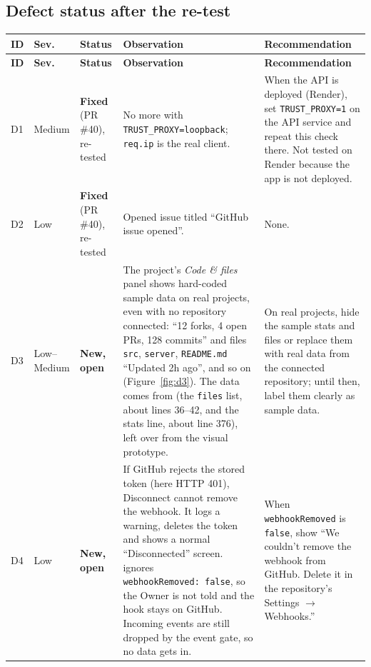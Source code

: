 \documentclass[11pt,a4paper]{article}
\begin{document}
\subsection{Defect status after the re-test}\label{sec:defect-status}
{\small
{}
\begin{xltabular}{\linewidth}{l l p{2.1cm} X X}
  \toprule
  \textbf{ID} & \textbf{Sev.} & \textbf{Status} & \textbf{Observation} & \textbf{Recommendation} \\
  \midrule
  \endfirsthead
  \toprule
  \textbf{ID} & \textbf{Sev.} & \textbf{Status} & \textbf{Observation} & \textbf{Recommendation} \\
  \midrule
  \endhead
  D1 & Medium & \textcolor{passgreen}{\textbf{Fixed}} (PR \#40), re-tested &
  No more  with \texttt{TRUST\_PROXY=loopback}; \texttt{req.ip} is the real client. &
  When the API is deployed (Render), set \texttt{TRUST\_PROXY=1} on the API service and repeat this check there.
  Not tested on Render because the app is not deployed. \\
  D2 & Low & \textcolor{passgreen}{\textbf{Fixed}} (PR \#40), re-tested &
  Opened issue titled ``GitHub issue opened''. & None. \\
  D3 & Low--Medium & \textcolor{failred}{\textbf{New, open}} &
  The project's \emph{Code \& files} panel shows hard-coded sample data on real projects, even with no repository connected:
  ``12 forks, 4 open PRs, 128 commits'' and files \texttt{src}, \texttt{server}, \texttt{README.md} ``Updated 2h ago'', and so on (Figure~\ref{fig:d3}).
  The data comes from  (the \texttt{files} list, about lines 36--42, and the stats line, about line 376), left over from the visual prototype. &
  On real projects, hide the sample stats and files or replace them with real data from the connected repository; until then, label them clearly as sample data. \\
  D4 & Low & \textcolor{failred}{\textbf{New, open}} &
  If GitHub rejects the stored token (here HTTP 401), Disconnect cannot remove the webhook. It logs a warning, deletes the token and shows a normal ``Disconnected'' screen.
   ignores \texttt{webhookRemoved:\ false}, so the Owner is not told and the hook stays on GitHub.
  Incoming events are still dropped by the event gate, so no data gets in. &
  When \texttt{webhookRemoved} is \texttt{false}, show ``We couldn't remove the webhook from GitHub. Delete it in the repository's Settings $\rightarrow$ Webhooks.''

\end{xltabular}}
\end{document}
